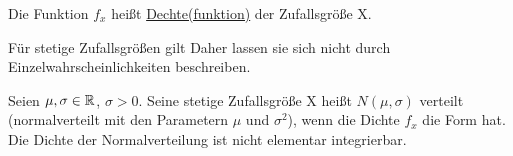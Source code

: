 \documentclass{../tudscript}
\begin{document}
Die Funktion $f_x$ heißt \underline{Dechte(funktion)} der Zufallsgröße X.

Für stetige Zufallsgrößen gilt
Daher lassen sie sich nicht durch Einzelwahrscheinlichkeiten beschreiben.

Seien $\mu, \sigma \in \mathbb{R}$, $\sigma > 0$.
Seine stetige Zufallsgröße X heißt $N(\mu, \sigma)$ verteilt (normalverteilt mit den Parametern $\mu$ und $\sigma^2$),
wenn die Dichte $f_x$ die Form
hat.
Die Dichte der Normalverteilung ist nicht elementar integrierbar.
\end{document}
